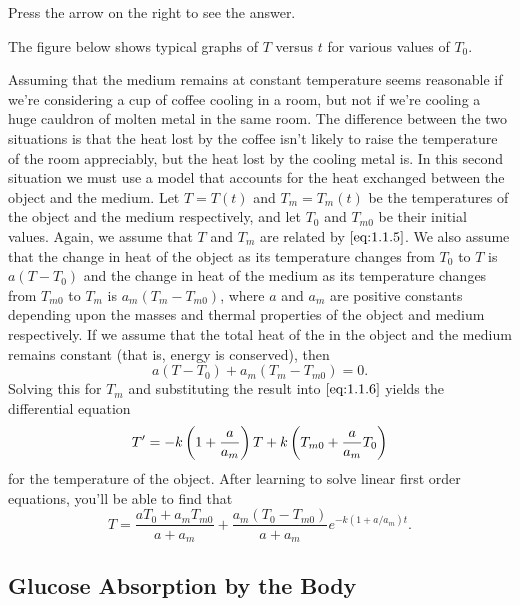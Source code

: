 \documentclass{ximera}
\begin{document}
Press the arrow on the right to see the answer.
 
The figure below shows typical graphs of $T$ versus $t$ for
various values of  $T_0$.

\begin{center}
\end{center}


 
Assuming that the medium remains at constant temperature seems
reasonable if we're considering a cup of coffee cooling in a room, but
 not if we're cooling a huge cauldron of molten
metal in the same room. The difference between the two situations is
that the heat lost by the coffee isn't likely to raise the
temperature of the room appreciably, but the heat lost by the
cooling metal is. In this second situation we must use a model that
accounts for the heat exchanged between the object and the medium. Let
$T=T(t)$ and $T_m=T_m(t)$ be the temperatures of the object and the
medium respectively, and let $T_0$ and $T_{m0}$ be their initial
values. Again, we assume that $T$ and $T_m$ are related by
$\eqref{eq:1.1.5}$. We also assume that the change in heat of
the object as its temperature changes from $T_0$ to $T$ is $a(T-T_0)$
and  the change in heat of the medium as its temperature changes
from $T_{m0}$ to $T_m$ is $a_m(T_m-T_{m0})$, where $a$ and $a_m$ are
positive constants depending upon the masses and thermal properties of
the object and medium respectively. If we assume that the total heat
of the in the object and the medium remains constant
(that is, energy is conserved), then
$$
a(T-T_0)+a_m(T_m-T_{m0})=0.
$$
Solving this for  $T_m$  and substituting the result into
$\eqref{eq:1.1.6}$ yields the differential equation
$$
T'=-k\left(1+{a\over a_m}\right)T
+k\left(T_{m0}+{a\over a_m}T_0\right)
$$
for the temperature of the object.  After learning to solve linear
first order  equations, you'll be able to find that
$$
T=\frac{aT_0+a_mT_{m0}}
{a+a_m}+\frac{a_m(T_0-T_{m0})}{a+a_m}e^{-k(1+a/a_m)t}.
$$
 
\subsection*{Glucose Absorption by the Body}
 
\end{document}
